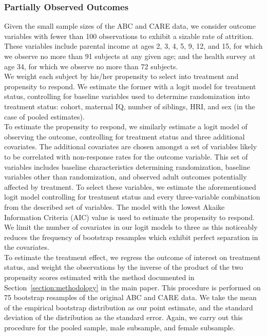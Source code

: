 \subsubsection{Partially Observed Outcomes}
\label{app:method_partialobs}

\noindent Given the small sample sizes of the ABC and CARE data, we consider outcome variables with fewer than 100 observations
to exhibit a sizable rate of attrition. These variables include parental income at ages 2, 3, 4, 5, 9, 12,
and 15, for which we observe no more than 91 subjects at any given age; and the health survey at
age 34, for which we observe no more than 72 subjects. \\

\noindent We weight each subject by
his/her propensity to select into treatment and propensity to respond. We estimate the
former with a logit model for treatment status, controlling for baseline
variables used to determine randomization into treatment status: cohort,
maternal IQ, number of siblings, HRI, and sex (in the case of pooled estimates). \\

\noindent To estimate the propensity to respond, we similarly estimate a logit model of observing the outcome,
controlling for treatment status and three additional covariates. The additional covariates are
chosen amongst a set of variables likely to be correlated with non-response rates for the outcome variable.
This set of variables includes baseline characteristics determining randomization,
baseline variables other than randomization, and observed adult outcomes potentially affected by
treatment. To select these variables, we estimate the
aforementioned logit model controlling for treatment status and every three-variable combination from
the described set of variables. The model with the lowest Akaike Information Criteria (AIC) value is used to estimate the propensity
to respond. We limit the number of covariates in our logit models to three as this noticeably reduces the frequency of bootstrap resamples which exhibit perfect separation in the covariates. \\

\noindent To estimate the treatment effect, we regress the outcome of interest on treatment status, and weight the
observations by the inverse of the product of the two propensity scores estimated with the method
documented in Section~\ref{section:methodology} in the main paper. This procedure is performed on 75 bootstrap resamples of the original ABC and CARE data.
We take the mean of the empirical bootstrap distribution as our point estimate, and the standard deviation
of the distribution as the standard error. Again, we carry out this procedure for the
pooled sample, male subsample, and female subsample. \\

